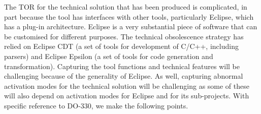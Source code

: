 \documentclass{llncs}
\begin{document}
The TOR for the technical solution that has been produced is complicated, in part because the tool has interfaces with other tools, particularly Eclipse, which has a plug-in architecture. Eclipse is a very substantial piece of software that can be customised for different purposes. The technical obsolescence strategy has relied on Eclipse CDT (a set of tools for development of C/C++, including parsers) and Eclipse Epsilon (a set of tools for code generation and transformation). Capturing the tool functions and technical features will be challenging because of the generality of Eclipse. As well, capturing abnormal activation modes for the technical solution will be challenging as some of these will also depend on activation modes for Eclipse and for its sub-projects. With specific reference to DO-330, we make the following points.
\end{document}
